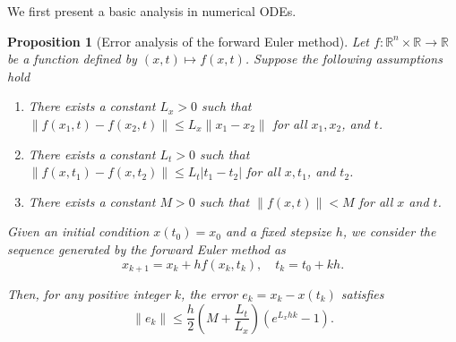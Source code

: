 \documentclass{article}
\newtheorem{proposition}{Proposition}
\begin{document}

We first present a basic analysis in numerical ODEs. 

\begin{proposition}[Error analysis of  the forward Euler method]
\label{prop:forward_Euler_error}
Let $f:\mathbb{R}^n\times\mathbb{R}\rightarrow \mathbb{R}$ be a function defined by $(x,t)\mapsto f(x,t)$. Suppose the following assumptions hold
\begin{enumerate}
    \item There exists a constant $ L_x > 0 $ such that $ \| f(x_1, t) - f(x_2, t) \| \leq L_x \| x_1 - x_2 \| $ for all $ x_1, x_2 $, and $ t $.
    \item There exists a constant $ L_t > 0 $ such that $ \| f(x, t_1) - f(x, t_2) \| \leq L_t | t_1 - t_2 | $ for all $ x, t_1 $, and $ t_2 $.
    \item There exists a constant $ M > 0 $ such that $ \| f(x, t) \| < M $ for all $ x $ and $ t $.
\end{enumerate}

Given an initial condition $ x(t_0) = x_0 $ and a fixed stepsize $ h $, we consider the sequence generated by the forward Euler method as
\[
x_{k+1} = x_k + h f(x_k, t_k), \quad t_k = t_0 + k h.
\]

Then, for any positive integer $k$, the error $e_k = x_k - x(t_k)$ satisfies
\[
\|e_k\| \leq \frac{h}{2} \left( M + \frac{L_t}{L_x} \right) \left( e^{L_x h k} - 1 \right).
\]
\end{proposition}
\end{document}
